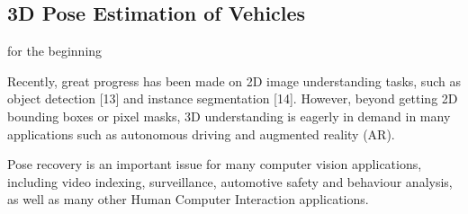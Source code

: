 \subsection{3D Pose Estimation of Vehicles}

for the beginning

Recently, great progress has been made on 2D image understanding
tasks, such as object detection [13] and instance
segmentation [14]. However, beyond getting 2D bounding
boxes or pixel masks, 3D understanding is eagerly in demand
in many applications such as autonomous driving and
augmented reality (AR).


Pose recovery is an important issue for many computer vision applications, including video indexing, surveillance, automotive safety and behaviour analysis, as well as many other Human Computer Interaction applications.






















